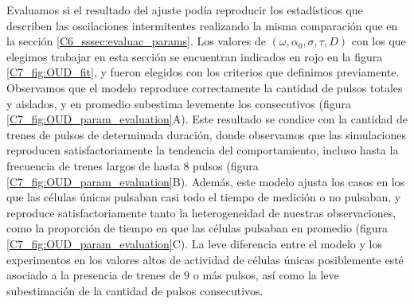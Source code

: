 \documentclass[./main.tex]{subfiles}
\begin{document}
Evaluamos si el resultado del ajuste podía reproducir los estadísticos que describen las oscilaciones intermitentes realizando la misma comparación que en la sección \ref{C6_sssec:evaluac_params}. Los valores de $(\omega,\alpha_0,\sigma,\tau,D)$ con los que elegimos trabajar en esta sección se encuentran indicados en rojo en la figura \ref{C7_fig:OUD_fit}, y fueron elegidos con los criterios que definimos previamente. Observamos que el modelo reproduce correctamente la cantidad de pulsos totales y aislados, y en promedio subestima levemente los consecutivos (figura \ref{C7_fig:OUD_param_evaluation}A). Este resultado se condice con la cantidad de trenes de pulsos de determinada duración, donde observamos que las simulaciones reproducen satisfactoriamente la tendencia del comportamiento, incluso hasta la frecuencia de trenes largos de hasta $8$ pulsos (figura \ref{C7_fig:OUD_param_evaluation}B). Además, este modelo ajusta los casos en los que las células únicas pulsaban casi todo el tiempo de medición o no pulsaban, y reproduce satisfactoriamente tanto la heterogeneidad de nuestras observaciones, como la proporción de tiempo en que las células pulsaban en promedio (figura \ref{C7_fig:OUD_param_evaluation}C). La leve diferencia  entre el modelo y los experimentos en los valores altos de actividad de células únicas posiblemente esté asociado a la presencia de trenes de $9$ o más pulsos, así como la leve subestimación de la cantidad de pulsos consecutivos. 
\end{document}
